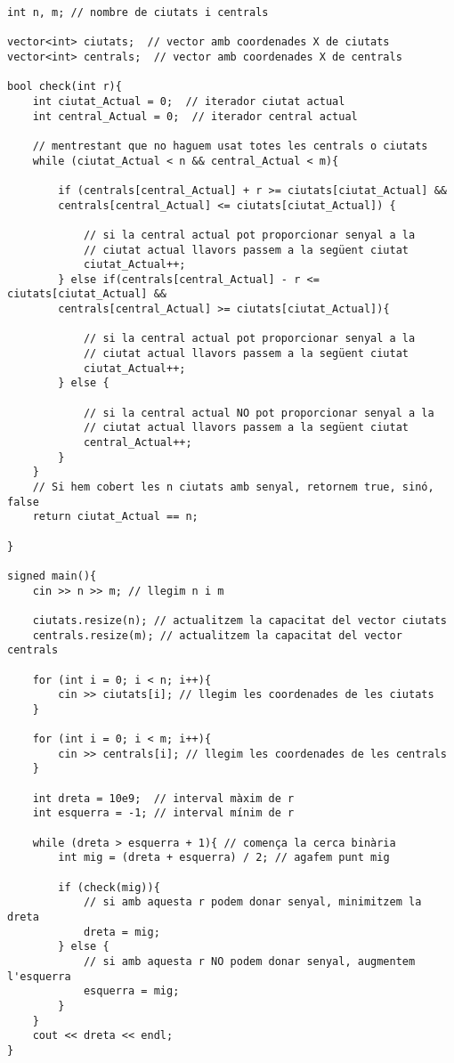 \begin{lstlisting}
int n, m; // nombre de ciutats i centrals
 
vector<int> ciutats;  // vector amb coordenades X de ciutats
vector<int> centrals;  // vector amb coordenades X de centrals
 
bool check(int r){
    int ciutat_Actual = 0;  // iterador ciutat actual
    int central_Actual = 0;  // iterador central actual
    
    // mentrestant que no haguem usat totes les centrals o ciutats
    while (ciutat_Actual < n && central_Actual < m){
    
        if (centrals[central_Actual] + r >= ciutats[ciutat_Actual] && 
        centrals[central_Actual] <= ciutats[ciutat_Actual]) {
        
            // si la central actual pot proporcionar senyal a la
            // ciutat actual llavors passem a la següent ciutat
            ciutat_Actual++;
        } else if(centrals[central_Actual] - r <= ciutats[ciutat_Actual] &&
        centrals[central_Actual] >= ciutats[ciutat_Actual]){
        
            // si la central actual pot proporcionar senyal a la
            // ciutat actual llavors passem a la següent ciutat
            ciutat_Actual++;
        } else {
        
            // si la central actual NO pot proporcionar senyal a la
            // ciutat actual llavors passem a la següent ciutat
            central_Actual++;
        }
    }
    // Si hem cobert les n ciutats amb senyal, retornem true, sinó, false
    return ciutat_Actual == n;
    
}

signed main(){
    cin >> n >> m; // llegim n i m
    
    ciutats.resize(n); // actualitzem la capacitat del vector ciutats
    centrals.resize(m); // actualitzem la capacitat del vector centrals
    
    for (int i = 0; i < n; i++){
        cin >> ciutats[i]; // llegim les coordenades de les ciutats
    }
    
    for (int i = 0; i < m; i++){
        cin >> centrals[i]; // llegim les coordenades de les centrals
    }
    
    int dreta = 10e9;  // interval màxim de r
    int esquerra = -1; // interval mínim de r
    
    while (dreta > esquerra + 1){ // comença la cerca binària
        int mig = (dreta + esquerra) / 2; // agafem punt mig
        
        if (check(mig)){
            // si amb aquesta r podem donar senyal, minimitzem la dreta
            dreta = mig;
        } else {
            // si amb aquesta r NO podem donar senyal, augmentem l'esquerra
            esquerra = mig;
        }
    }
    cout << dreta << endl;
}
\end{lstlisting}

\newpage




